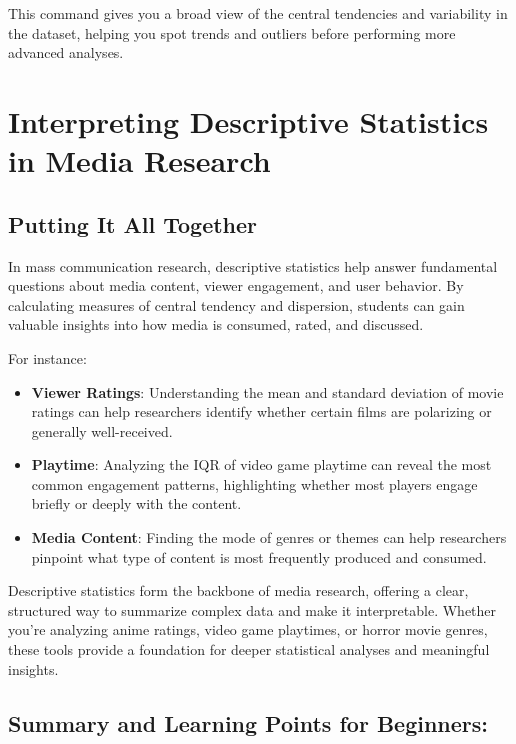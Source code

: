 \documentclass[
]{book}
\providecommand{\tightlist}{%
  \setlength{\itemsep}{0pt}\setlength{\parskip}{0pt}}
\begin{document}
This command gives you a broad view of the central tendencies and variability in the dataset, helping you spot trends and outliers before performing more advanced analyses.

\section{Interpreting Descriptive Statistics in Media Research}\label{interpreting-descriptive-statistics-in-media-research}

\subsection*{Putting It All Together}\label{putting-it-all-together}

In mass communication research, descriptive statistics help answer fundamental questions about media content, viewer engagement, and user behavior. By calculating measures of central tendency and dispersion, students can gain valuable insights into how media is consumed, rated, and discussed.

For instance:

\begin{itemize}
\tightlist
\item
  \textbf{Viewer Ratings}: Understanding the mean and standard deviation of movie ratings can help researchers identify whether certain films are polarizing or generally well-received.
\item
  \textbf{Playtime}: Analyzing the IQR of video game playtime can reveal the most common engagement patterns, highlighting whether most players engage briefly or deeply with the content.
\item
  \textbf{Media Content}: Finding the mode of genres or themes can help researchers pinpoint what type of content is most frequently produced and consumed.
\end{itemize}

Descriptive statistics form the backbone of media research, offering a clear, structured way to summarize complex data and make it interpretable. Whether you're analyzing anime ratings, video game playtimes, or horror movie genres, these tools provide a foundation for deeper statistical analyses and meaningful insights.

\subsection*{Summary and Learning Points for Beginners:}\label{summary-and-learning-points-for-beginners}
\end{document}
